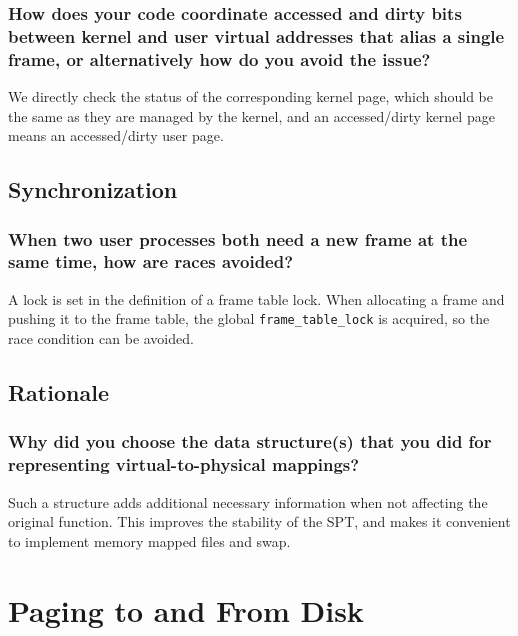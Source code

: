 \documentclass[sigconf, nonacm, balance=false, urlbreakonhyphens=true]{acmart}
\begin{document}
            \subsubsection{How does your code coordinate accessed and dirty bits between kernel and user virtual addresses that alias a single frame, or alternatively how do you avoid the issue? }

                We directly check the status of the corresponding kernel page, which should be the same as they are managed by the kernel, and an accessed/dirty kernel page means an accessed/dirty user page. 
        
        \subsection{Synchronization}

            \subsubsection{When two user processes both need a new frame at the same time, how are races avoided? }

                A lock is set in the definition of a frame table lock. When allocating a frame and pushing it to the frame table, the global \texttt{frame\_table\_lock} is acquired, so the race condition can be avoided. 
        
        \subsection{Rationale}
            
            \subsubsection{Why did you choose the data structure(s) that you did for representing virtual-to-physical mappings? } 

                Such a structure adds additional necessary information when not affecting the original function. This improves the stability of the SPT, and makes it convenient to implement memory mapped files and swap. 
    
    \section{Paging to and From Disk}

        \label{Paging to and From Disk}
\end{document}
